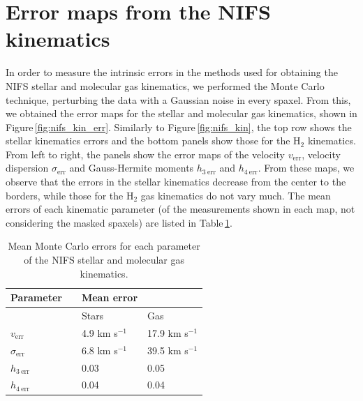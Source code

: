 \documentclass[fleqn,usenatbib]{mnras}
\begin{document}
\section{Error maps from the NIFS kinematics}

In order to measure the intrinsic errors in the methods used for obtaining the NIFS stellar and molecular gas kinematics, we performed the Monte Carlo technique, perturbing the data with a Gaussian noise in every spaxel. From this, we obtained the error maps for the stellar and molecular gas kinematics, shown in Figure\,\ref{fig:nifs_kin_err}. Similarly to Figure\,\ref{fig:nifs_kin}, the top row shows the stellar kinematics errors and the bottom panels show those for the H$_2$ kinematics. From left to right, the panels show the error maps of the velocity $v_\mathrm{err}$, velocity dispersion $\sigma_\mathrm{err}$ and Gauss-Hermite moments $h_{3\ \mathrm{err}}$ and $h_{4\ \mathrm{err}}$. From these maps, we observe that the errors in the stellar kinematics decrease from the center to the borders, while those for the H$_2$ gas kinematics do not vary much. The mean errors of each kinematic parameter (of the measurements shown in each map, not considering the masked spaxels) are listed in Table\,\ref{tab:nifs_kin_err}.

\begin{table}
\caption{Mean Monte Carlo errors for each parameter of the NIFS stellar and molecular gas kinematics.}
\label{tab:nifs_kin_err}
\begin{center}
\begin{tabular}{llll}
\hline
\hline
Parameter             &   & Mean error  &     \\ \hline
        & &Stars          & Gas \\ \hline \hline
$v_\mathrm{err}$      &   & 4.9 km s$^{-1}$ & 17.9 km s$^{-1}$ \\
$\sigma_\mathrm{err}$ &   & 6.8 km s$^{-1}$ & 39.5 km s$^{-1}$ \\
$h_{3\ \mathrm{err}}$ &   & 0.03  & 0.05            \\
$h_{4\ \mathrm{err}}$ &   & 0.04  & 0.04            \\ \hline \hline
\end{tabular}
\end{center}
\end{table}
\end{document}
